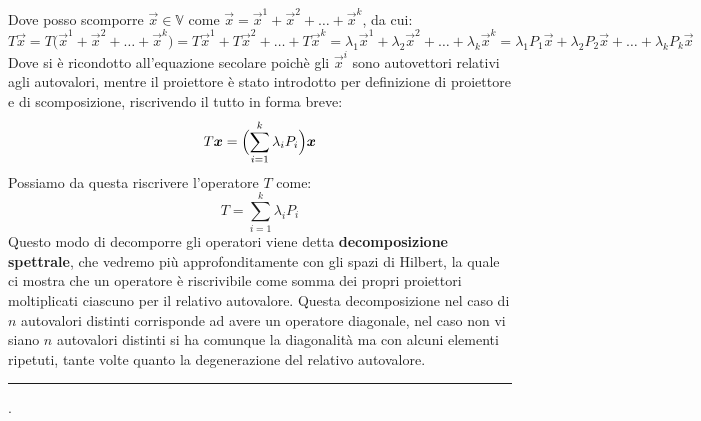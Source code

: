 Dove posso scomporre $\vec{x}\in\mathbb{V}$ come $\vec{x}=\vec{x}^1+\vec{x}^2+\dots+\vec{x}^k$, da cui:
\begin{equation*}
    T\vec{x} =
    T \bigl( \vec{x}^1+\vec{x}^2+\dots+\vec{x}^k \bigr) =
    T\vec{x}^1 + T\vec{x}^2 + \dots + T\vec{x}^k =
    \lambda_1\vec{x}^1 + \lambda_2\vec{x}^2 + \dots + \lambda_k\vec{x}^k =
    \lambda_1 P_1\vec{x} + \lambda_2 P_2\vec{x} + \dots + \lambda_k P_k\vec{x}
\end{equation*}
Dove si è ricondotto all'equazione secolare poichè gli $\vec{x}^i$ sono autovettori relativi agli autovalori, mentre il proiettore è stato introdotto per definizione di proiettore e di scomposizione, riscrivendo il tutto in forma breve:
\begin{equation}
    T\vec{x} = \Bigl( \sum_{i=1}^{k} \lambda_i P_i \Bigr) \vec{x}
\end{equation}
Possiamo da questa riscrivere l'operatore $T$ come:
\begin{equation}
    T = \sum_{i=1}^{k} \lambda_i P_i
\end{equation}
Questo modo di decomporre gli operatori viene detta \textbf{decomposizione spettrale}, che vedremo più approfonditamente con gli spazi di Hilbert, la quale ci mostra che un operatore è riscrivibile come somma dei propri proiettori moltiplicati ciascuno per il relativo autovalore. Questa decomposizione nel caso di $n$ autovalori distinti corrisponde ad avere un operatore diagonale, nel caso non vi siano $n$ autovalori distinti si ha comunque la diagonalità ma con alcuni elementi ripetuti, tante volte quanto la degenerazione del relativo autovalore.
\\

\par\noindent\rule[1pt]{\textwidth}{0.8pt}

\begin{exmp}
    .
\end{exmp}

